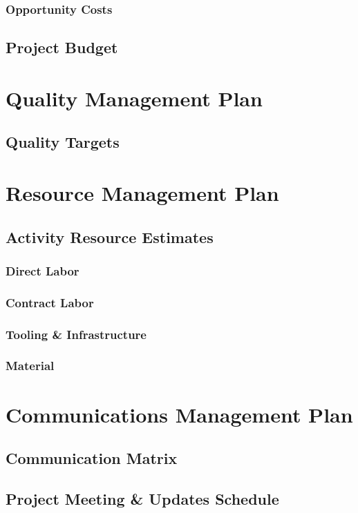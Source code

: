 \documentclass[12pt,letterpaper]{report}
\begin{document}
	\subsection{Opportunity Costs}
	\section{Project Budget}
	
	\chapter{Quality Management Plan}
	\section{Quality Targets}
	
	\chapter{Resource Management Plan}
	\section{Activity Resource Estimates}
	\subsection{Direct Labor}
	\subsection{Contract Labor}
	\subsection{Tooling \& Infrastructure}
	\subsection{Material}
	
	\chapter{Communications Management Plan}
	\section{Communication Matrix}
	\section{Project Meeting \& Updates Schedule}
\end{document}
